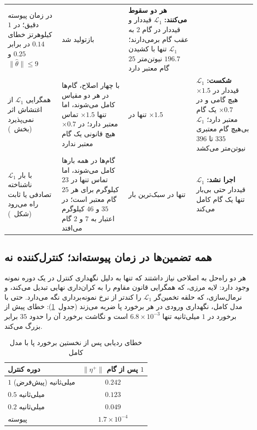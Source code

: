 \documentclass[10pt,twocolumn]{article}
\newcommand{\en}[1]{\lr{#1}}
\begin{document}
\begin{table}[!t]
\begin{tabular}{p{}p{}>{\centering\arraybackslash}p{}p{}}
            در زمان پیوسته دقیق؛ در $1$ کیلوهرتز خطای $0.14$ در برابر $0.25$ و $\|\hat\theta\|\le9$ & بازتولید شد &
            \textbf{هر دو سقوط می‌کنند:} $\mathcal{L}_1$ قیددار و \en{CLF-QP} قیددار در گام $2$ به عقب
            گام برمی‌دارند؛ $\mathcal{L}_1$ تنها با کشیدن $196.7$ نیوتن‌متر $25$ گام معتبر دارد \\
        همگرایی $\mathcal{L}_1$ از اغتشاش اثر نمی‌پذیرد (بخش~\en{4.2.4}) &
            با چهار اصلاح، گام‌ها در هر دو مقیاس کامل می‌شوند، اما تنها $\times1.5$ تماس معتبر
            دارد؛ در $\times0.7$ هیچ قانونی یک گام معتبر ندارد & تنها در $\times1.5$ &
            \textbf{شکست:} $\mathcal{L}_1$ قیددار در $\times1.5$ هیچ گامی و در $\times0.7$ یک گام معتبر
            دارد؛ $\mathcal{L}_1$ بی‌هیچ گام معتبری $335$ تا $396$ نیوتن‌متر می‌کشد \\
        $\mathcal{L}_1$ با بار ناشناخته تصادفی یا ثابت راه می‌رود (شکل~\en{4.11}) &
            گام‌ها در همه بارها کامل می‌شوند، اما تماس تنها در $23$ کیلوگرم برای هر $25$ گام
            معتبر است؛ در $35$ و $46$ کیلوگرم اعتبار به $7$ و $2$ گام می‌افتد & تنها در سبک‌ترین بار &
            \textbf{اجرا نشد:} $\mathcal{L}_1$ قیددار حتی بی‌بار تنها یک گام کامل می‌کند \\
        \bottomrule
    \end{tabular}
\end{table}

\subsection{همه تضمین‌ها در زمان پیوسته‌اند؛ کنترل‌کننده نه}
هر دو راه‌حل به اصلاحی نیاز داشتند که تنها به دلیل نگهداری کنترل در یک دوره نمونه
وجود دارد: لایه مرزی، که همگرایی قانون مقاوم را به کران‌داری نهایی تبدیل می‌کند، و
نرمال‌سازی، که حلقه تخمین‌گر $\mathcal{L}_1$ را کندتر از نرخ نمونه‌برداری نگه
می‌دارد. حتی با مدل کامل، نگهداری ورودی در هر برخورد پا ضربه می‌زند
(جدول~\ref{tab:kick}): خطای پیش از برخورد در $1$ میلی‌ثانیه تنها
$6.8\times10^{-3}$ است و نگاشت برخورد آن را حدود $35$ برابر بزرگ می‌کند.

\begin{table}[H]
    \centering
    \caption{خطای ردیابی پس از نخستین برخورد پا با مدل کامل}
    \label{tab:kick}
    \small
    \begin{tabular}{lc}
        \toprule
        دوره کنترل & $\|\eta^+\|$ پس از گام $1$ \\
        \midrule
        $1$ میلی‌ثانیه (پیش‌فرض) & $0.242$ \\
        $0.5$ میلی‌ثانیه & $0.123$ \\
        $0.2$ میلی‌ثانیه & $0.049$ \\
        پیوسته & $1.7\times10^{-4}$ \\
        \bottomrule
    \end{tabular}
\end{table}
\end{document}

